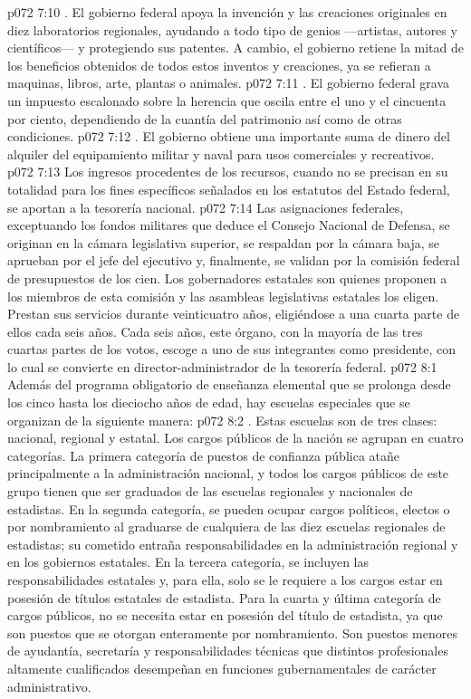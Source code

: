 \vs p072 7:10 . El gobierno federal apoya la invención y las creaciones originales en diez laboratorios regionales, ayudando a todo tipo de genios ---artistas, autores y científicos--- y protegiendo sus patentes. A cambio, el gobierno retiene la mitad de los beneficios obtenidos de todos estos inventos y creaciones, ya se refieran a maquinas, libros, arte, plantas o animales.
\vs p072 7:11 . El gobierno federal grava un impuesto escalonado sobre la herencia que oscila entre el uno y el cincuenta por ciento, dependiendo de la cuantía del patrimonio así como de otras condiciones.
\vs p072 7:12 . El gobierno obtiene una importante suma de dinero del alquiler del equipamiento militar y naval para usos comerciales y recreativos.
\vs p072 7:13  Los ingresos procedentes de los recursos, cuando no se precisan en su totalidad para los fines específicos señalados en los estatutos del Estado federal, se aportan a la tesorería nacional.
\vs p072 7:14 \pc Las asignaciones federales, exceptuando los fondos militares que deduce el Consejo Nacional de Defensa, se originan en la cámara legislativa superior, se respaldan por la cámara baja, se aprueban por el jefe del ejecutivo y, finalmente, se validan por la comisión federal de presupuestos de los cien. Los gobernadores estatales son quienes proponen a los miembros de esta comisión y las asambleas legislativas estatales los eligen. Prestan sus servicios durante veinticuatro años, eligiéndose a una cuarta parte de ellos cada seis años. Cada seis años, este órgano, con la mayoría de las tres cuartas partes de los votos, escoge a uno de sus integrantes como presidente, con lo cual se convierte en director\hyp{}administrador de la tesorería federal.
\vs p072 8:1 Además del programa obligatorio de enseñanza elemental que se prolonga desde los cinco hasta los dieciocho años de edad, hay escuelas especiales que se organizan de la siguiente manera:
\vs p072 8:2 . Estas escuelas son de tres clases: nacional, regional y estatal. Los cargos públicos de la nación se agrupan en cuatro categorías. La primera categoría de puestos de confianza pública atañe principalmente a la administración nacional, y todos los cargos públicos de este grupo tienen que ser graduados de las escuelas regionales y nacionales de estadistas. En la segunda categoría, se pueden ocupar cargos políticos, electos o por nombramiento al graduarse de cualquiera de las diez escuelas regionales de estadistas; su cometido entraña responsabilidades en la administración regional y en los gobiernos estatales. En la tercera categoría, se incluyen las responsabilidades estatales y, para ella, solo se le requiere a los cargos estar en posesión de títulos estatales de estadista. Para la cuarta y última categoría de cargos públicos, no se necesita estar en posesión del título de estadista, ya que son puestos que se otorgan enteramente por nombramiento. Son puestos menores de ayudantía, secretaría y responsabilidades técnicas que distintos profesionales altamente cualificados desempeñan en funciones gubernamentales de carácter administrativo.
